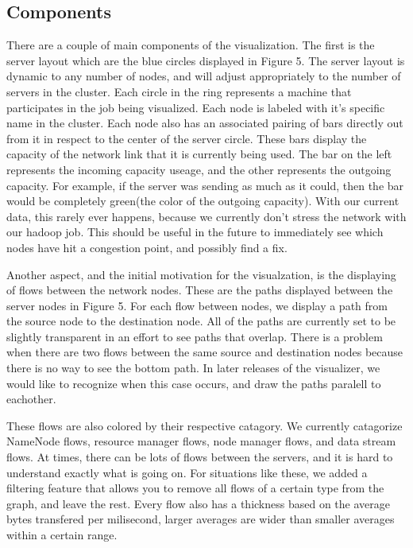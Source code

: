 \subsection{Components}
\label{ssec:comp}
There are a couple of main components of the visualization. The first
is the server layout which are the blue circles displayed in Figure
5. The server layout is dynamic to any number of
nodes, and will adjust appropriately to the number of servers in the
cluster. Each circle in the ring represents a machine that
participates in the job being visualized. Each node is labeled with
it's specific name in the cluster. Each node also has an associated
pairing of bars directly out from it in respect to the center of the
server circle. These bars display the capacity of the network
link that it is currently being used. The bar on the left represents
the incoming capacity useage, and the other represents the outgoing
capacity. For example, if the server was sending as much as it could,
then the bar would be completely green(the color of the outgoing
capacity). With our current data, this rarely ever happens, because we
currently don't stress the network with our hadoop job. This should be
useful in the future to immediately see which nodes have hit a
congestion point, and possibly find a fix.

Another aspect, and the initial motivation for the visualzation, is the
displaying of flows between the network nodes. These are the paths
displayed between the server nodes in Figure 5. For each flow between
nodes, we display a path from the source node to the destination node.
All of the paths are currently set to be slightly transparent in an
effort to see paths that overlap. There is a problem when there are
two flows between the same source and destination nodes because there
is no way to see the bottom path. In later releases of the visualizer,
we would like to recognize when this case occurs, and draw the paths
paralell to eachother.

These flows are also colored by their respective catagory. We
currently catagorize NameNode flows, resource manager flows, node
manager flows, and data stream flows. At times, there can be lots
of flows between the servers, and it is hard to understand exactly
what is going on. For situations like these, we added a filtering
feature that allows you to remove all flows of a certain type from the
graph, and leave the rest. Every flow also has a thickness based on
the average bytes transfered per milisecond, larger averages are wider
than smaller averages within a certain range.

